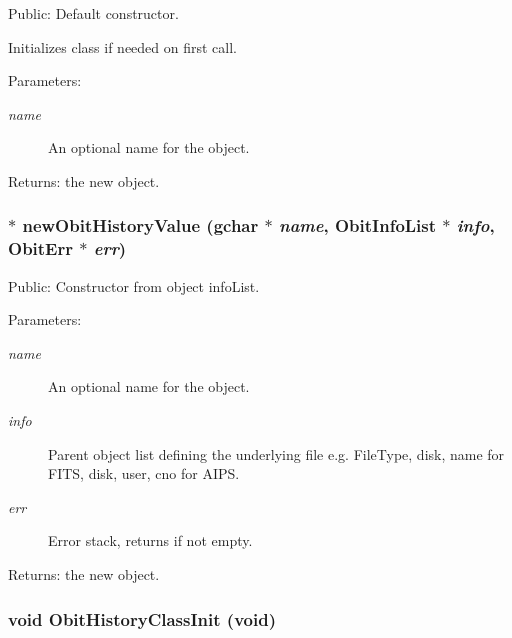 Public: Default constructor. 

Initializes class if needed on first call. \begin{Desc}
\item[Parameters:]
\begin{description}
\item[{\em name}]An optional name for the object. \end{description}
\end{Desc}
\begin{Desc}
\item[Returns:]the new object. \end{Desc}
\subsubsection{$\ast$ new\-Obit\-History\-Value (gchar $\ast$ {\em name}, {\bf Obit\-Info\-List} $\ast$ {\em info}, {\bf Obit\-Err} $\ast$ {\em err})}\label{ObitHistory_8h_a11}


Public: Constructor from object info\-List. 

\begin{Desc}
\item[Parameters:]
\begin{description}
\item[{\em name}]An optional name for the object. \item[{\em info}]Parent object list defining the underlying file e.g. File\-Type, disk, name for FITS, disk, user, cno for AIPS. \item[{\em err}]Error stack, returns if not empty. \end{description}
\end{Desc}
\begin{Desc}
\item[Returns:]the new object. \end{Desc}
\subsubsection{\setlength{\rightskip}{0pt plus 5cm}void Obit\-History\-Class\-Init (void)}\label{ObitHistory_8h_a8}


